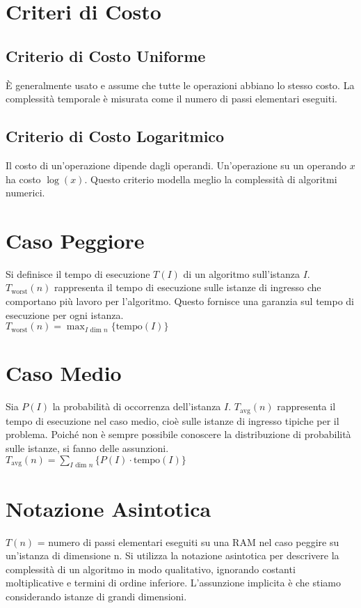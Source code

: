 \documentclass{article}
\begin{document}
\section{Criteri di Costo}

\subsection{Criterio di Costo Uniforme}
È generalmente usato e assume che tutte le operazioni abbiano lo stesso costo. La complessità temporale è misurata come il numero di passi elementari eseguiti.

\subsection{Criterio di Costo Logaritmico}
Il costo di un'operazione dipende dagli operandi. Un'operazione su un operando $x$ ha costo $\log(x)$. Questo criterio modella meglio la complessità di algoritmi numerici.

\section{Caso Peggiore}

Si definisce il tempo di esecuzione $T(I)$ di un algoritmo sull'istanza $I$. $T_{\text{worst}}(n)$ rappresenta il tempo di esecuzione sulle istanze di ingresso che comportano più lavoro per l'algoritmo. Questo fornisce una garanzia sul tempo di esecuzione per ogni istanza.
\\
$T_{\text{worst}}(n) = \max_{I \text{ dim } n} \{\text{tempo}(I)\}$

\section{Caso Medio}

Sia $P(I)$ la probabilità di occorrenza dell'istanza $I$. $T_{\text{avg}}(n)$ rappresenta il tempo di esecuzione nel caso medio, cioè sulle istanze di ingresso tipiche per il problema. Poiché non è sempre possibile conoscere la distribuzione di probabilità sulle istanze, si fanno delle assunzioni.
\\
$T_{\text{avg}}(n) = \sum_{I \text{ dim } n} \{P(I) \cdot \text{tempo}(I)\}$

\section{Notazione Asintotica}
$T(n)$ = numero di passi elementari eseguiti su una RAM nel caso peggire su un'istanza di dimensione n.
Si utilizza la notazione asintotica per descrivere la complessità di un algoritmo in modo qualitativo, ignorando costanti moltiplicative e termini di ordine inferiore. L'assunzione implicita è che stiamo considerando istanze di grandi dimensioni.
\end{document}
